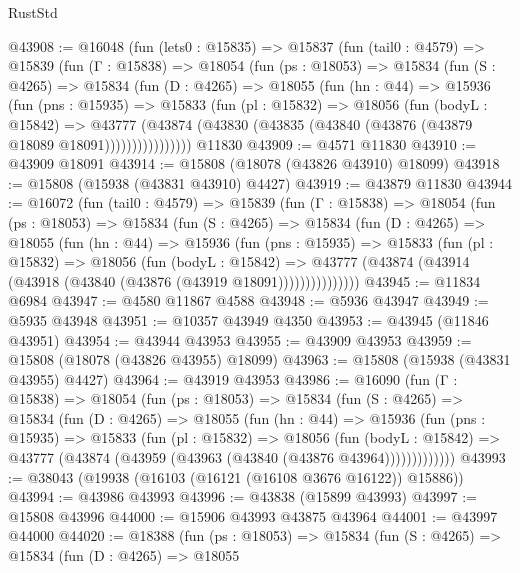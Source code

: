 \begin{lexlean}{RustStd}
\begin{coremodule}
@43908 := @16048
    (fun (lets0 : @15835) =>
    @15837
      (fun (tail0 : @4579) =>
      @15839
        (fun (Γ : @15838) =>
        @18054
          (fun (ps : @18053) =>
          @15834
            (fun (S : @4265) =>
            @15834
              (fun (D : @4265) =>
              @18055
                (fun (hn : @44) =>
                @15936
                  (fun (pns : @15935) =>
                  @15833
                    (fun (pl : @15832) =>
                    @18056
                      (fun (bodyL : @15842) =>
                      @43777
                        (@43874
                          (@43830 (@43835 (@43840 (@43876 (@43879 @18089 @18091))))))))))))))))
    @11830
@43909 := @4571 @11830
@43910 := @43909 @18091
@43914 := @15808 (@18078 (@43826 @43910) @18099)
@43918 := @15808 (@15938 (@43831 @43910) @4427)
@43919 := @43879 @11830
@43944 := @16072
    (fun (tail0 : @4579) =>
    @15839
      (fun (Γ : @15838) =>
      @18054
        (fun (ps : @18053) =>
        @15834
          (fun (S : @4265) =>
          @15834
            (fun (D : @4265) =>
            @18055
              (fun (hn : @44) =>
              @15936
                (fun (pns : @15935) =>
                @15833
                  (fun (pl : @15832) =>
                  @18056
                    (fun (bodyL : @15842) =>
                    @43777 (@43874 (@43914 (@43918 (@43840 (@43876 (@43919 @18091)))))))))))))))
@43945 := @11834 @6984
@43947 := @4580 @11867 @4588
@43948 := @5936 @43947
@43949 := @5935 @43948
@43951 := @10357 @43949 @4350
@43953 := @43945 (@11846 @43951)
@43954 := @43944 @43953
@43955 := @43909 @43953
@43959 := @15808 (@18078 (@43826 @43955) @18099)
@43963 := @15808 (@15938 (@43831 @43955) @4427)
@43964 := @43919 @43953
@43986 := @16090
    (fun (Γ : @15838) =>
    @18054
      (fun (ps : @18053) =>
      @15834
        (fun (S : @4265) =>
        @15834
          (fun (D : @4265) =>
          @18055
            (fun (hn : @44) =>
            @15936
              (fun (pns : @15935) =>
              @15833
                (fun (pl : @15832) =>
                @18056
                  (fun (bodyL : @15842) =>
                  @43777 (@43874 (@43959 (@43963 (@43840 (@43876 @43964)))))))))))))
@43993 := @38043 (@19938 (@16103 (@16121 (@16108 @3676 @16122)) @15886))
@43994 := @43986 @43993
@43996 := @43838 (@15899 @43993)
@43997 := @15808 @43996
@44000 := @15906 @43993 @43875 @43964
@44001 := @43997 @44000
@44020 := @18388
    (fun (ps : @18053) =>
    @15834
      (fun (S : @4265) =>
      @15834
        (fun (D : @4265) =>
        @18055

\end{coremodule}
\end{lexlean}
